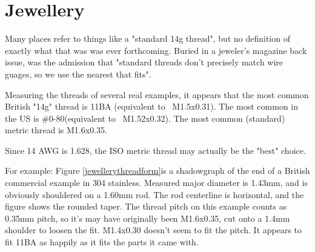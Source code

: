 \clearpage
\section{Jewellery}
Many places refer to things like a "standard 14g thread", but no definition of exactly what that was was ever forthcoming.  Buried in a jeweler's magazine back issue, was the admission that "standard threads don't precisely match wire guages, so we use the nearest that fits".  

Measuring the threads of several real examples, it appears that the most common British "14g" thread is 11BA (equivalent to ~M1.5x0.31).  The most common in the US is \#0-80(equivalent to ~M1.52x0.32).  The most common (standard) metric thread is M1.6x0.35.

Since 14 AWG is 1.628, the ISO metric thread may actually be the "best" choice.

For example: Figure \ref{jewellerythreadform}is a shadowgraph of the end of a British commercial example in 304 stainless.  Measured major diameter is 1.43mm, and is obviously shouldered on a 1.60mm rod. The rod centerline is horizontal, and the figure shows the rounded taper.  The thread pitch on this example counts as 0.35mm pitch, so it's may have originally been M1.6x0.35, cut onto a 1.4mm shoulder to loosen the fit.  M1.4x0.30 doesn't seem to fit the pitch.  It appears to fit 11BA as happily as it fits the parts it came with.
\\ \\ \\ \\ \\ \\ \\ \\ \\ \\ \\ \\ \\ \\ \\ \\ \\ \\               



\clearpage
